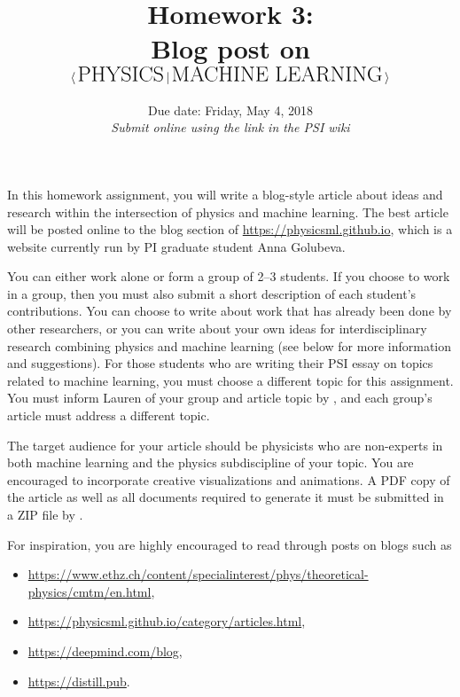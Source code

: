 \documentclass[letterpaper]{scrartcl}
\begin{document}

\vspace{-3cm}

\title{Homework 3: \\ Blog post on
$\langle \, \text{\LARGE PHYSICS} \, \vert \, \text{\LARGE MACHINE LEARNING} \, \rangle$ \vspace*{-6mm}}

\date{Due date: Friday, May 4, 2018 \\ \textit{\normalsize{Submit online using the link in the PSI wiki}}}

\maketitle

In this homework assignment, you will write a blog-style article about ideas and research within the intersection of physics and machine learning.
The best article will be posted online to the blog section of {\small\url{https://physicsml.github.io}}, 
which is a website currently run by PI graduate student Anna Golubeva.

You can either work alone or form a group of 2--3 students. 
If you choose to work in a group, then you must also submit a short description of each student's contributions.
You can choose to write about work that has already been done by other researchers, 
or you can write about your own ideas for interdisciplinary research combining physics and machine learning
(see below for more information and suggestions).
For those students who are writing their PSI essay on topics related to machine learning, 
you must choose a different topic for this assignment.
You must inform Lauren of your group and article topic by 
\normalfont,
and each group's article must address a different topic.

The target audience for your article should be physicists who are non-experts in 
both machine learning and the physics subdiscipline of your topic.
You are encouraged to incorporate creative visualizations and animations.
A PDF copy of the article as well as all documents required to generate it must be submitted in a ZIP file by
\normalfont.

For inspiration, you are highly encouraged to read through posts on blogs such as
\vspace*{-1mm}\begin{itemize}[leftmargin=*,labelindent=2mm,itemsep=-1mm,label=$\circ$]
\item {\small\url{https://www.ethz.ch/content/specialinterest/phys/theoretical-physics/cmtm/en.html}},
\item {\small\url{https://physicsml.github.io/category/articles.html}},
\item {\small\url{https://deepmind.com/blog}},
\item {\small\url{https://distill.pub}}.
\end{itemize}
\end{document}
